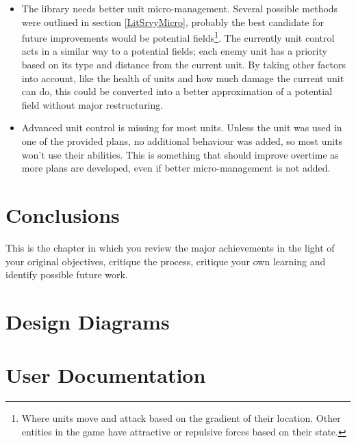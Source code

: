 \documentclass[11pt,openright,a4paper]{report}
\begin{document}
\begin{itemize}
\item{The library needs better unit micro-management. Several possible methods were outlined in section \ref{LitSrvyMicro}, probably the best candidate for future improvements would be potential fields\footnote{Where units move and attack based on the gradient of their location. Other entities in the game have attractive or repulsive forces based on their state.}. The currently unit control acts in a similar way to a potential fields; each enemy unit has a priority based on its type and distance from the current unit. By taking other factors into account, like the health of units and how much damage the current unit can do, this could be converted into a better approximation of a potential field without major restructuring.}
\item{Advanced unit control is missing for most units. Unless the unit was used in one of the provided plans, no additional behaviour was added, so most units won't use their abilities. This is something that should improve overtime as more plans are developed, even if better micro-management is not added.}
\end{itemize}










\chapter{Conclusions}
%

This is the chapter in which you review the major achievements in the
light of your original objectives, critique the process, critique your
own learning and identify possible future work.



\appendix


\chapter{Design Diagrams}

\chapter{User Documentation}
\end{document}
